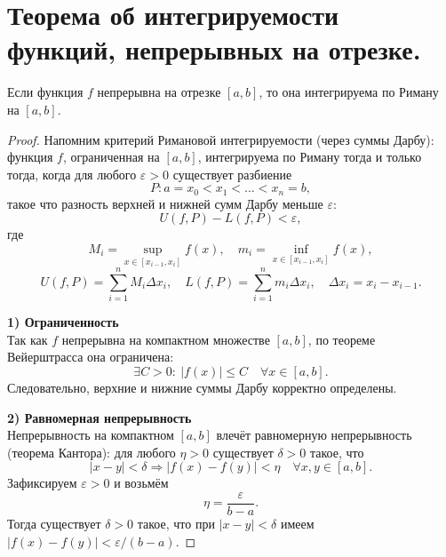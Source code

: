\documentclass[14pt]{extreport}
\begin{document}
\chapter{Теорема об интегрируемости функций, непрерывных на отрезке.}

    \begin{theorem}
        Если функция $f$ непрерывна на отрезке $[a,b]$, то она интегрируема по Риману на $[a,b]$.
    \end{theorem}

    \begin{proof}
        Напомним критерий Римановой интегрируемости (через суммы Дарбу): функция $f$, ограниченная на $[a,b]$, интегрируема по Риману тогда и только тогда, когда для любого $\varepsilon>0$ существует разбиение
        \[
        P: a = x_0 < x_1 < ... < x_n = b,
        \]
        такое что разность верхней и нижней сумм Дарбу меньше $\varepsilon$:
        \[
        U(f,P) - L(f,P) < \varepsilon,
        \]
        где
        \[
        M_i = \sup_{x \in [x_{i-1},x_i]} f(x), \quad m_i = \inf_{x \in [x_{i-1},x_i]} f(x),
        \]
        \[
        U(f,P) = \sum_{i=1}^n M_i \Delta x_i, \quad L(f,P) = \sum_{i=1}^n m_i \Delta x_i, \quad \Delta x_i = x_i - x_{i-1}.
        \]

        \textbf{1) Ограниченность}\\
        Так как $f$ непрерывна на компактном множестве $[a,b]$, по теореме Вейерштрасса она ограничена:
        \[
        \exists C > 0:\ |f(x)| \leq C \quad \forall x \in [a,b].
        \]
        Следовательно, верхние и нижние суммы Дарбу корректно определены.

        \textbf{2) Равномерная непрерывность}\\
        Непрерывность на компактном $[a,b]$ влечёт равномерную непрерывность (теорема Кантора): для любого $\eta>0$ существует $\delta>0$ такое, что
        \[
        |x-y| < \delta \Rightarrow |f(x)-f(y)| < \eta \quad \forall x,y \in [a,b].
        \]
        Зафиксируем $\varepsilon>0$ и возьмём
        \[
        \eta = \frac{\varepsilon}{b-a}.
        \]
        Тогда существует $\delta>0$ такое, что при $|x-y| < \delta$ имеем $|f(x)-f(y)| < \varepsilon/(b-a)$.


\end{proof}
\end{document}
